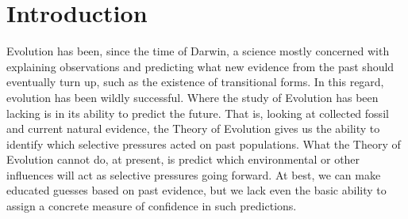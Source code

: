 \chapter{Introduction} %
\label{cha:introduction}
Evolution has been, since the time of Darwin, a science mostly concerned with explaining observations and predicting what new evidence from the past should eventually turn up, such as the existence of transitional forms. In this regard, evolution has been wildly successful. Where the study of Evolution has been lacking is in its ability to predict the future. That is, looking at collected fossil and current natural evidence, the Theory of Evolution gives us the ability to identify which selective pressures acted on past populations. What the Theory of Evolution cannot do, at present, is predict which environmental or other influences will act as selective pressures going forward. At best, we can make educated guesses based on past evidence, but we lack even the basic ability to assign a concrete measure of confidence in such predictions.

